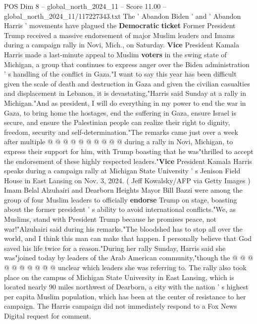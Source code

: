 \begin{textsample}{POS Dim 8 – global\_north\_2024\_11 – Score 11.00 – global\_north\_2024\_11/117227343.txt}  \label{ex:f8_pos_154}
The ' Abandon Biden ' and ' Abandon Harris ' movements have plagued the \textbf{Democratic} \textbf{ticket} Former President Trump received a massive endorsement of major Muslim leaders and Imams during a campaign rally in Novi, Mich., on Saturday. \textbf{Vice} President Kamala Harris made a last-minute appeal to Muslim \textbf{voters} in the swing state of Michigan, a group that continues to express anger over the Biden administration ' s handling of the conflict in Gaza."I want to say this year has been difficult given the scale of death and destruction in Gaza and given the civilian casualties and displacement in Lebanon, it is devastating,"Harris said Sunday at a rally in Michigan."And as president, I will do everything in my power to end the war in Gaza, to bring home the hostages, end the suffering in Gaza, ensure Israel is secure, and ensure the Palestinian people can realize their right to dignity, freedom, security and self-determination."The remarks came just over a week after multiple @ @ @ @ @ @ @ @ @ @ during a rally in Novi, Michigan, to express their support for him, with Trump boasting that he was"thrilled to accept the endorsement of these highly respected leaders."\textbf{Vice} President Kamala Harris speaks during a campaign rally at Michigan State University ' s Jenison Field House in East Lansing on Nov. 3, 2024. ( Jeff Kowalsky/AFP via Getty Images ) Imam Belal Alzuhairi and Dearborn Heights Mayor Bill Bazzi were among the group of four Muslim leaders to officially \textbf{endorse} Trump on stage, boasting about the former president ' s ability to avoid international conflicts."We, as Muslims, stand with President Trump because he promises peace, not war!"Alzuhairi said during his remarks."The bloodshed has to stop all over the world, and I think this man can make that happen.
I personally believe that God saved his life twice for a reason."During her rally Sunday, Harris said she was"joined today by leaders of the Arab American community,"though the @ @ @ @ @ @ @ @ @ @ unclear which leaders she was referring to.
The rally also took place on the campus of Michigan State University in East Lansing, which is located nearly 90 miles northwest of Dearborn, a city with the nation ' s highest per capita Muslim population, which has been at the center of resistance to her campaign.
The Harris campaign did not immediately respond to a Fox News Digital request for comment.

\end{textsample}
